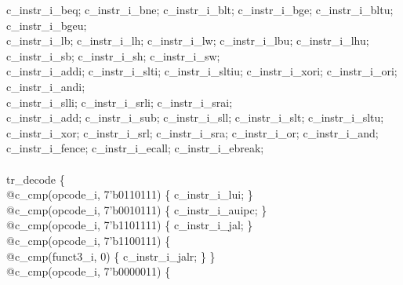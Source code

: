 {\indent c\_instr\_i\_beq; \space c\_instr\_i\_bne; \space c\_instr\_i\_blt; \space c\_instr\_i\_bge; \space c\_instr\_i\_bltu; \space c\_instr\_i\_bgeu;\\%
\indent c\_instr\_i\_lb; \space c\_instr\_i\_lh; \space c\_instr\_i\_lw; \space c\_instr\_i\_lbu; \space c\_instr\_i\_lhu;\\%
\indent c\_instr\_i\_sb; \space c\_instr\_i\_sh; \space c\_instr\_i\_sw;\\%
\indent c\_instr\_i\_addi; \space c\_instr\_i\_slti; \space c\_instr\_i\_sltiu; \space c\_instr\_i\_xori; \space c\_instr\_i\_ori; \space c\_instr\_i\_andi;\\%
\indent c\_instr\_i\_slli; \space c\_instr\_i\_srli; \space c\_instr\_i\_srai;\\%
\indent c\_instr\_i\_add; \space c\_instr\_i\_sub; \space c\_instr\_i\_sll; \space c\_instr\_i\_slt; \space c\_instr\_i\_sltu;\\%
\indent c\_instr\_i\_xor; \space c\_instr\_i\_srl; \space c\_instr\_i\_sra; \space c\_instr\_i\_or; \space c\_instr\_i\_and;\\%
\indent c\_instr\_i\_fence; \space c\_instr\_i\_ecall; \space c\_instr\_i\_ebreak;\\%
\\
\indent tr\_decode \{\\%
\indent \hspace{\parindent} @c\_cmp(opcode\_i, 7'b0110111) \{ c\_instr\_i\_lui; \}\\%
\indent \hspace{\parindent} @c\_cmp(opcode\_i, 7'b0010111) \{ c\_instr\_i\_auipc; \}\\%
\indent \hspace{\parindent} @c\_cmp(opcode\_i, 7'b1101111) \{ c\_instr\_i\_jal; \}\\%
\indent \hspace{\parindent} @c\_cmp(opcode\_i, 7'b1100111) \{\\%
\indent \hspace{\parindent} \hspace{\parindent} @c\_cmp(funct3\_i, 0) \{ c\_instr\_i\_jalr; \} \}\\%
\indent \hspace{\parindent} @c\_cmp(opcode\_i, 7'b0000011) \{\\%
}
